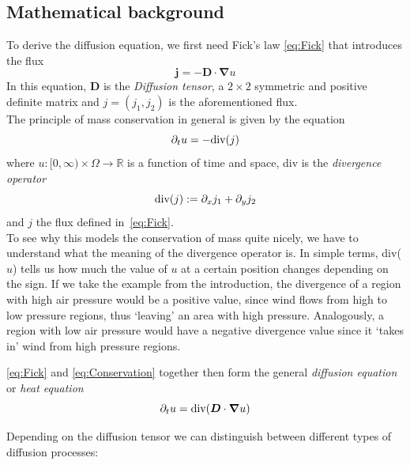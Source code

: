\subsection{Mathematical background}
To derive the diffusion equation, we first need Fick's law \eqref{eq:Fick} that introduces the
flux
\begin{equation}
    \boldsymbol j = -\boldsymbol D\cdot\boldsymbol\nabla u\label{eq:Fick}
\end{equation}
In this equation, $\boldsymbol D$ is the \textit{Diffusion tensor}, a $2\times2$ symmetric and
positive definite matrix and $j = (j_1, j_2)$ is the aforementioned flux.\cite{dic18-02}\\
The principle of mass conservation in general is given by the equation
\begin{equation}
    \partial_t u = - \textnormal{div}(j)\label{eq:Conservation}
\end{equation}
where $u: [0, \infty) \times \Omega \rightarrow \mathbb{R}$ is a function of time and space, div
is the \textit{divergence operator}
\[\textnormal{div}(j) := \partial_x j_1 + \partial_y j_2\]
and $j$ the flux defined in~\eqref{eq:Fick}.\\
To see why this models the conservation of mass quite nicely, we have to understand what the
meaning of the divergence operator is.
In simple terms, div($u$) tells us how much the value of $u$ at a certain position changes
depending on the sign.
If we take the example from the introduction, the divergence of a region with high air pressure 
would be a positive value, since wind flows from high to low pressure regions, thus `leaving' an 
area with high pressure.
Analogously, a region with low air pressure would have a negative divergence value since it 
`takes in' wind from high pressure regions.\\


\eqref{eq:Fick} and \eqref{eq:Conservation} together then form the general \textit{diffusion
    equation} or \textit{heat equation}\cite{dic18-02, weickert96}
\begin{equation}
    \partial_t u = \textnormal{div}(\boldsymbol D\cdot\boldsymbol\nabla u)\label{eq:Diffusion}
\end{equation}

Depending on the diffusion tensor we can distinguish between different types of diffusion
processes:
